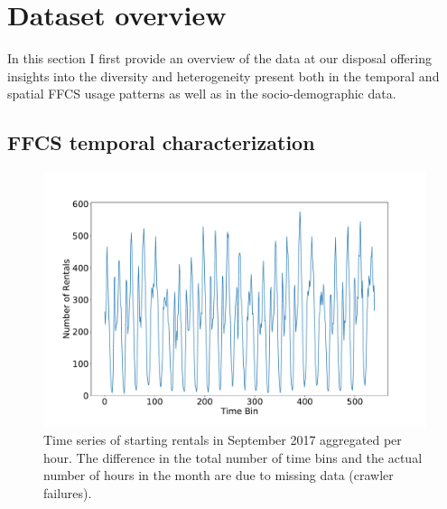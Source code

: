 \section{Dataset overview}
\label{sec:8_3_datasetoverview}

In this section I first provide an overview of the data at our disposal offering insights into the diversity and heterogeneity present both in the temporal and spatial FFCS usage patterns as well as in the socio-demographic data.  

\subsection{FFCS temporal characterization}

%
\begin{figure}
\begin{center}
            \includegraphics[width=0.65\columnwidth]{figures/temporal_characterization/BookingsHourAnalysisPeriod.pdf}
             \caption{Time series of starting rentals in September 2017 aggregated per hour. The difference in the total number of time bins and the actual number of hours in the month are due to missing data (crawler failures).}
            \label{fig:8_3_time_series}
    \end{center}
\end{figure}
%
